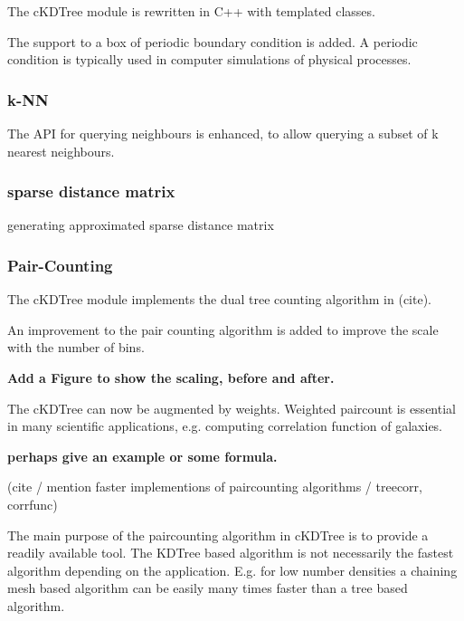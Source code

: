 The cKDTree module is rewritten in C++ with templated classes.

The support to a box of periodic boundary condition is added. A periodic
condition is typically used in computer simulations of physical processes.

\subsubsection{k-NN}

The API for querying neighbours is enhanced, to allow querying a subset of
k nearest neighbours.

\subsubsection{sparse distance matrix}

generating approximated sparse distance matrix

\subsubsection{Pair-Counting}

The cKDTree module implements the dual tree counting algorithm in (cite).

An improvement to the pair counting algorithm is added to improve the scale
with the number of bins.

\textbf{Add a Figure to show the scaling, before and after.}

The cKDTree can now be augmented by weights. Weighted paircount is essential
in many scientific applications, e.g. computing correlation function of galaxies.

\textbf{perhaps give an example or some formula.}

(cite / mention faster implementions of paircounting algorithms / treecorr, corrfunc)

The main purpose of the paircounting algorithm in cKDTree is to provide a readily
available tool. The KDTree based algorithm is not necessarily the fastest algorithm
depending on the application. E.g. for low number densities a chaining mesh based algorithm
can be easily many times faster than a tree based algorithm.

